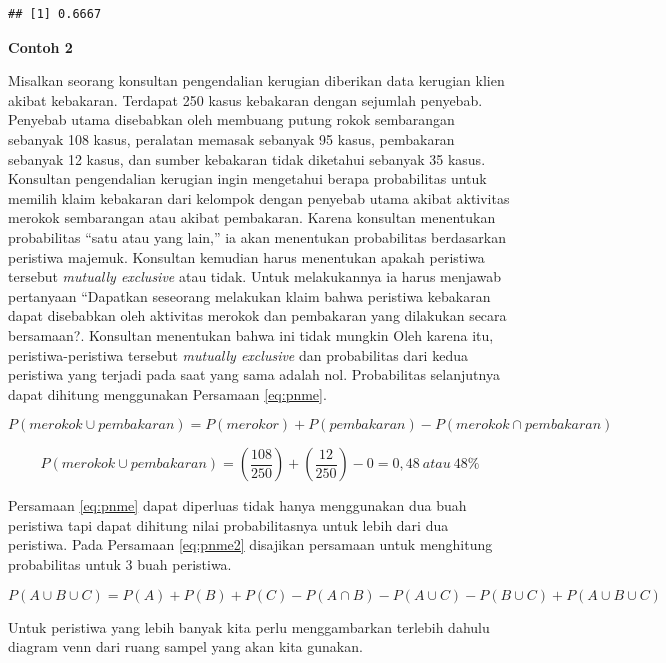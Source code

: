 \documentclass[]{book}
\begin{document}
\begin{verbatim}
## [1] 0.6667
\end{verbatim}

\textbf{Contoh 2}

Misalkan seorang konsultan pengendalian kerugian diberikan data kerugian
klien akibat kebakaran. Terdapat 250 kasus kebakaran dengan sejumlah
penyebab. Penyebab utama disebabkan oleh membuang putung rokok
sembarangan sebanyak 108 kasus, peralatan memasak sebanyak 95 kasus,
pembakaran sebanyak 12 kasus, dan sumber kebakaran tidak diketahui
sebanyak 35 kasus. Konsultan pengendalian kerugian ingin mengetahui
berapa probabilitas untuk memilih klaim kebakaran dari kelompok dengan
penyebab utama akibat aktivitas merokok sembarangan atau akibat
pembakaran. Karena konsultan menentukan probabilitas ``satu atau yang
lain,'' ia akan menentukan probabilitas berdasarkan peristiwa majemuk.
Konsultan kemudian harus menentukan apakah peristiwa tersebut
\emph{mutually exclusive} atau tidak. Untuk melakukannya ia harus
menjawab pertanyaan ``Dapatkan seseorang melakukan klaim bahwa peristiwa
kebakaran dapat disebabkan oleh aktivitas merokok dan pembakaran yang
dilakukan secara bersamaan?. Konsultan menentukan bahwa ini tidak
mungkin Oleh karena itu, peristiwa-peristiwa tersebut \emph{mutually
exclusive} dan probabilitas dari kedua peristiwa yang terjadi pada saat
yang sama adalah nol. Probabilitas selanjutnya dapat dihitung
menggunakan Persamaan \eqref{eq:pnme}.

\[
P\left(merokok\cup pembakaran\right)=P\left(merokor\right)+P\left(pembakaran\right)-P\left(merokok\cap pembakaran\right)
\]

\[
P\left(merokok\cup pembakaran\right)=\left(\frac{108}{250}\right)+\left(\frac{12}{250}\right)-0=0,48\ atau\ 48\%
\]

Persamaan \eqref{eq:pnme} dapat diperluas tidak hanya menggunakan dua buah
peristiwa tapi dapat dihitung nilai probabilitasnya untuk lebih dari dua
peristiwa. Pada Persamaan \eqref{eq:pnme2} disajikan persamaan untuk
menghitung probabilitas untuk 3 buah peristiwa.

\begin{equation}
   P\left(A\cup B\cup C\right)=P\left(A\right)+P\left(B\right)+P\left(C\right)-P\left(A\cap B\right)-P\left(A\cup C\right)-P\left(B\cup C\right)+P\left(A\cup B\cup C\right)
  \label{eq:pnme2}
\end{equation}

Untuk peristiwa yang lebih banyak kita perlu menggambarkan terlebih
dahulu diagram venn dari ruang sampel yang akan kita gunakan.
\end{document}
